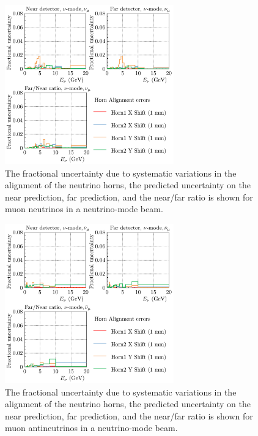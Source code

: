 \documentclass{article}
\begin{document}
\begin{figure}
  \centering
  \includegraphics[width=0.65\textwidth]{plots/fracerrs/numode_numu_HornAlignment}
  \caption{The fractional uncertainty due to systematic variations in the alignment of the neutrino horns, the predicted uncertainty on the near prediction, far prediction, and the near/far ratio is shown for muon neutrinos in a neutrino-mode beam. }
  \label{fig:hornalign_nu_numu}
\end{figure}

\begin{figure}
  \centering
  \includegraphics[width=0.65\textwidth]{plots/fracerrs/numode_numubar_HornAlignment}
  \caption{The fractional uncertainty due to systematic variations in the alignment of the neutrino horns, the predicted uncertainty on the near prediction, far prediction, and the near/far ratio is shown for muon antineutrinos in a neutrino-mode beam.}
  \label{fig:hornalign_nu_numubar}
\end{figure}
\end{document}
